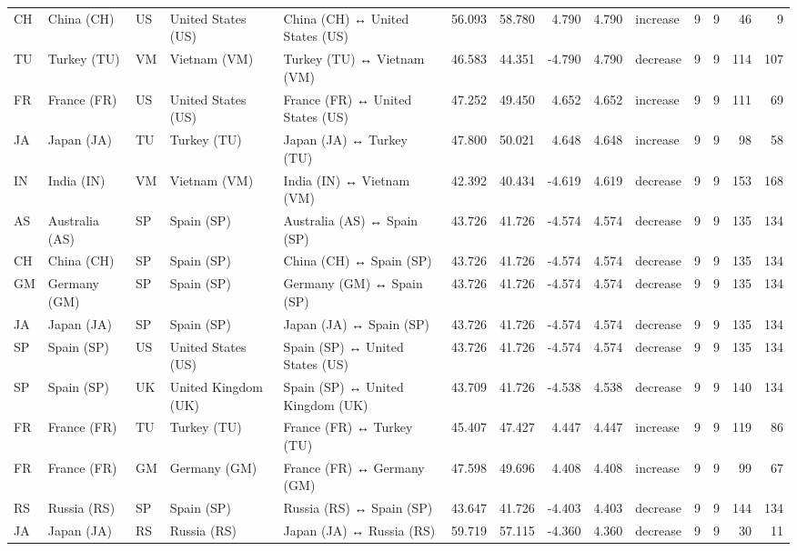 \begin{tabular}{lllllrrrrlrrrr}
CH & China (CH) & US & United States (US) & China (CH) ↔ United States (US) & 56.093 & 58.780 & 4.790 & 4.790 & increase & 9 & 9 & 46 & 9 \\
TU & Turkey (TU) & VM & Vietnam (VM) & Turkey (TU) ↔ Vietnam (VM) & 46.583 & 44.351 & -4.790 & 4.790 & decrease & 9 & 9 & 114 & 107 \\
FR & France (FR) & US & United States (US) & France (FR) ↔ United States (US) & 47.252 & 49.450 & 4.652 & 4.652 & increase & 9 & 9 & 111 & 69 \\
JA & Japan (JA) & TU & Turkey (TU) & Japan (JA) ↔ Turkey (TU) & 47.800 & 50.021 & 4.648 & 4.648 & increase & 9 & 9 & 98 & 58 \\
IN & India (IN) & VM & Vietnam (VM) & India (IN) ↔ Vietnam (VM) & 42.392 & 40.434 & -4.619 & 4.619 & decrease & 9 & 9 & 153 & 168 \\
AS & Australia (AS) & SP & Spain (SP) & Australia (AS) ↔ Spain (SP) & 43.726 & 41.726 & -4.574 & 4.574 & decrease & 9 & 9 & 135 & 134 \\
CH & China (CH) & SP & Spain (SP) & China (CH) ↔ Spain (SP) & 43.726 & 41.726 & -4.574 & 4.574 & decrease & 9 & 9 & 135 & 134 \\
GM & Germany (GM) & SP & Spain (SP) & Germany (GM) ↔ Spain (SP) & 43.726 & 41.726 & -4.574 & 4.574 & decrease & 9 & 9 & 135 & 134 \\
JA & Japan (JA) & SP & Spain (SP) & Japan (JA) ↔ Spain (SP) & 43.726 & 41.726 & -4.574 & 4.574 & decrease & 9 & 9 & 135 & 134 \\
SP & Spain (SP) & US & United States (US) & Spain (SP) ↔ United States (US) & 43.726 & 41.726 & -4.574 & 4.574 & decrease & 9 & 9 & 135 & 134 \\
SP & Spain (SP) & UK & United Kingdom (UK) & Spain (SP) ↔ United Kingdom (UK) & 43.709 & 41.726 & -4.538 & 4.538 & decrease & 9 & 9 & 140 & 134 \\
FR & France (FR) & TU & Turkey (TU) & France (FR) ↔ Turkey (TU) & 45.407 & 47.427 & 4.447 & 4.447 & increase & 9 & 9 & 119 & 86 \\
FR & France (FR) & GM & Germany (GM) & France (FR) ↔ Germany (GM) & 47.598 & 49.696 & 4.408 & 4.408 & increase & 9 & 9 & 99 & 67 \\
RS & Russia (RS) & SP & Spain (SP) & Russia (RS) ↔ Spain (SP) & 43.647 & 41.726 & -4.403 & 4.403 & decrease & 9 & 9 & 144 & 134 \\
JA & Japan (JA) & RS & Russia (RS) & Japan (JA) ↔ Russia (RS) & 59.719 & 57.115 & -4.360 & 4.360 & decrease & 9 & 9 & 30 & 11 \\

\end{tabular}
